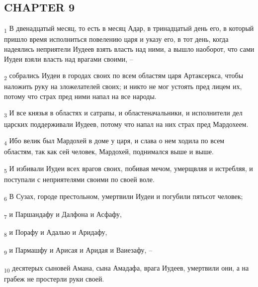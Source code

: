 \subsection{CHAPTER 9}
\begin{tcolorbox}
\textsubscript{1} В двенадцатый месяц, то есть в месяц Адар, в тринадцатый день его, в который пришло время исполниться повелению царя и указу его, в тот день, когда надеялись неприятели Иудеев взять власть над ними, а вышло наоборот, что сами Иудеи взяли власть над врагами своими, --
\end{tcolorbox}
\begin{tcolorbox}
\textsubscript{2} собрались Иудеи в городах своих по всем областям царя Артаксеркса, чтобы наложить руку на зложелателей своих; и никто не мог устоять пред лицем их, потому что страх пред ними напал на все народы.
\end{tcolorbox}
\begin{tcolorbox}
\textsubscript{3} И все князья в областях и сатрапы, и областеначальники, и исполнители дел царских поддерживали Иудеев, потому что напал на них страх пред Мардохеем.
\end{tcolorbox}
\begin{tcolorbox}
\textsubscript{4} Ибо велик был Мардохей в доме у царя, и слава о нем ходила по всем областям, так как сей человек, Мардохей, поднимался выше и выше.
\end{tcolorbox}
\begin{tcolorbox}
\textsubscript{5} И избивали Иудеи всех врагов своих, побивая мечом, умерщвляя и истребляя, и поступали с неприятелями своими по своей воле.
\end{tcolorbox}
\begin{tcolorbox}
\textsubscript{6} В Сузах, городе престольном, умертвили Иудеи и погубили пятьсот человек;
\end{tcolorbox}
\begin{tcolorbox}
\textsubscript{7} и Паршандафу и Далфона и Асфафу,
\end{tcolorbox}
\begin{tcolorbox}
\textsubscript{8} и Порафу и Адалью и Аридафу,
\end{tcolorbox}
\begin{tcolorbox}
\textsubscript{9} и Пармашфу и Арисая и Аридая и Ваиезафу, --
\end{tcolorbox}
\begin{tcolorbox}
\textsubscript{10} десятерых сыновей Амана, сына Амадафа, врага Иудеев, умертвили они, а на грабеж не простерли руки своей.
\end{tcolorbox}
